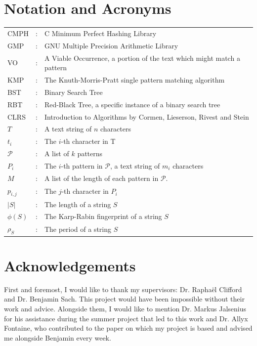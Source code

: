 \documentclass[ %
                    author={Dominic Joseph Moylett},
                    degree={MEng},
                     title={Dictionary Matching with Fingerprints},
                  subtitle={An Empirical Analysis},
                      type={research},
                      year={2015} ]{dissertation}
\begin{document}

\chapter*{Notation and Acronyms}

\begin{tabular}{lcl}
CMPH &: & C Minimum Perfect Hashing Library \\
GMP &: & GNU Multiple Precision Arithmetic Library \\
VO &: & A Viable Occurrence, a portion of the text which might match a pattern \\
KMP &: & The Knuth-Morris-Pratt single pattern matching algorithm \\
BST &: & Binary Search Tree \\
RBT &: & Red-Black Tree, a specific instance of a binary search tree \\
CLRS &: & Introduction to Algorithms by Cormen, Lieserson, Rivest and Stein \\
$T$ &: & A text string of $n$ characters \\
$t_i$ &: & The $i$-th character in T \\
$\mathcal{P}$ &: & A list of $k$ patterns \\
$P_i$ &: & The $i$-th pattern in $\mathcal{P}$, a text string of $m_i$ characters \\
$M$ &: & A list of the length of each pattern in $\mathcal{P}$. \\
$p_{i,j}$ &: & The $j$-th character in $P_i$ \\
$|S|$ &: & The length of a string $S$ \\
$\phi(S)$ &: & The Karp-Rabin fingerprint of a string $S$ \\
$\rho_S$ &: & The period of a string $S$ \\
\end{tabular}


\chapter*{Acknowledgements}

First and foremost, I would like to thank my supervisors: Dr. Rapha\"{e}l Clifford and Dr. Benjamin Sach. This project would have been impossible without their work and advice. Alongside them, I would like to mention Dr. Markus Jalsenius for his assistance during the summer project that led to this work and Dr. Allyx Fontaine, who contributed to the paper on which my project is based and advised me alongside Benjamin every week.
\end{document}
